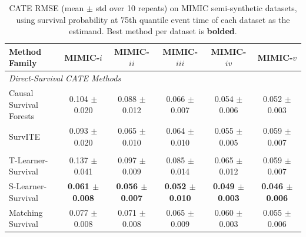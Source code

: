\documentclass{article} %
\begin{document}
\begin{table}[!ht]
\centering
\footnotesize
\setlength{\tabcolsep}{4pt}
\caption{CATE RMSE (mean $\pm$ std over 10 repeats) on MIMIC semi-synthetic datasets, using survival probability at 75th quantile event time of each dataset as the estimand. Best method per dataset is \textbf{bolded}.}
\label{tab:cate_rmse_prob75}
        \begin{subtable}{\linewidth}
        \centering
        \begin{tabular}{lccccc}
        \toprule
        \textbf{Method Family} & \textbf{MIMIC-$i$} & \textbf{MIMIC-$ii$} & \textbf{MIMIC-$iii$} & \textbf{MIMIC-$iv$} & \textbf{MIMIC-$v$} \\
        \midrule
        \multicolumn{6}{l}{\textit{Direct-Survival CATE Methods}} \\
                Causal Survival Forests & 0.104 $\pm$ 0.020 & 0.088 $\pm$ 0.012 & 0.066 $\pm$ 0.007 & 0.054 $\pm$ 0.006 & 0.052 $\pm$ 0.003 \\ 
                SurvITE & 0.093 $\pm$ 0.020 & 0.065 $\pm$ 0.010 & 0.064 $\pm$ 0.010 & 0.055 $\pm$ 0.005 & 0.059 $\pm$ 0.007 \\ 
        \addlinespace
        \multicolumn{6}{l}{\textit{Survival Meta-Learners}} \\
                T-Learner-Survival & 0.137 $\pm$ 0.041 & 0.097 $\pm$ 0.009 & 0.085 $\pm$ 0.014 & 0.065 $\pm$ 0.012 & 0.059 $\pm$ 0.007 \\ 
                S-Learner-Survival & \textbf{0.061 $\pm$ 0.008} & \textbf{0.056 $\pm$ 0.007} & \textbf{0.052 $\pm$ 0.010} & \textbf{0.049 $\pm$ 0.003} & \textbf{0.046 $\pm$ 0.006} \\ 
                Matching Survival & 0.077 $\pm$ 0.008 & 0.071 $\pm$ 0.008 & 0.065 $\pm$ 0.009 & 0.060 $\pm$ 0.003 & 0.055 $\pm$ 0.006 \\ 
        \bottomrule
        \end{tabular}
        \end{subtable}

        \vspace{0.6em}


\end{table}
\end{document}
